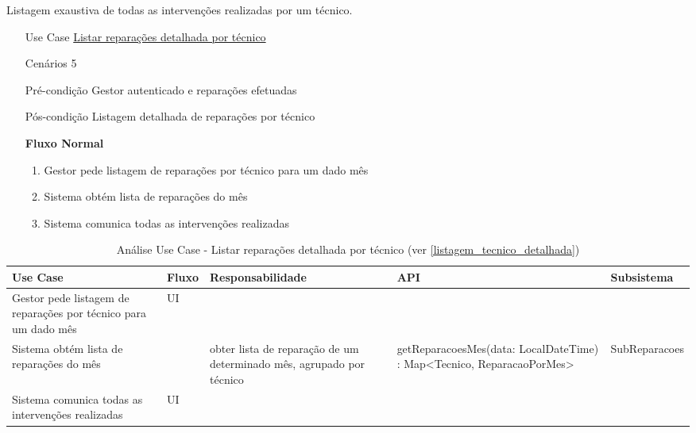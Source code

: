 \documentclass[../relatorio.tex]{subfiles}
\begin{document}
Listagem exaustiva de todas as intervenções realizadas por um técnico.
\begin{itemize}
    \item[Use Case] {\underline{Listar reparações detalhada por técnico}}
    \item[Cenários] {5}
    \item[Pré-condição] {Gestor autenticado e reparações efetuadas}
    \item[Pós-condição] {Listagem detalhada de reparações por técnico}
          \begin{flushleft}
              \textbf{Fluxo Normal}
          \end{flushleft}
          \begin{enumerate}
              \item Gestor pede listagem de reparações por técnico para um dado mês %
              \item Sistema obtém lista de reparações do mês %
              \item Sistema comunica todas as intervenções realizadas %
          \end{enumerate}
\end{itemize}
\begin{landscape}
    \begin{table}[!h]
        \centering
        \begin{tabular}{|p{5cm}|p{1cm}|p{4cm}|p{6cm}|p{4cm}|}
            \hline
            \rowcolor{gray!20!white}
            Use Case & Fluxo & Responsabilidade & API & Subsistema \\
            \hline
            \rowcolor{yellow}
            Gestor pede listagem de reparações por técnico para um dado mês
                     & 
            UI
                     & 
                     & 
                     & 
            \\
            \hline
            Sistema obtém lista de reparações do mês
                     & 
                     & 
            obter lista de reparação de um determinado mês, agrupado por técnico
                     & 
            getReparacoesMes(data: LocalDateTime) : Map<Tecnico, ReparacaoPorMes>
                     & 
            SubReparacoes
            \\
            \hline
            \rowcolor{yellow}
            Sistema comunica todas as intervenções realizadas
                     & 
            UI
                     & 
                     & 
                     & 
            \\
        \end{tabular}
        \caption{Análise Use Case - Listar reparações detalhada por técnico (ver \ref{listagem_tecnico_detalhada})}
    \end{table}
\end{landscape}
\end{document}
